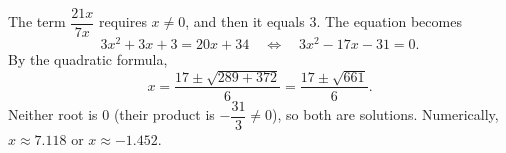 The term $\dfrac{21x}{7x}$ requires $x\ne0$, and then it equals $3$. The equation becomes
\[3x^2+3x+3=20x+34\quad\Longleftrightarrow\quad 3x^2-17x-31=0 .\]
By the quadratic formula,
\[x=\dfrac{17\pm\sqrt{289+372}}{6}=\boxed{\dfrac{17\pm\sqrt{661}}{6}}.\]
Neither root is $0$ (their product is $-\dfrac{31}{3}\ne0$), so both are solutions. Numerically, $x\approx7.118$ or $x\approx-1.452$.
